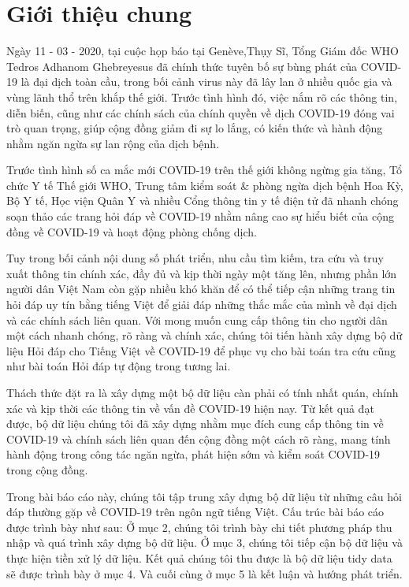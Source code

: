 \documentclass[runningheads]{llncs}
\begin{document}
\section{Giới thiệu chung}

Ngày 11 - 03 - 2020, tại cuộc họp báo tại Genève,Thụy Sĩ, Tổng Giám đốc WHO Tedros Adhanom Ghebreyesus đã chính thức tuyên bố sự bùng phát của COVID-19 là đại dịch toàn cầu, trong bối cảnh virus này đã lây lan ở nhiều quốc gia và vùng lãnh thổ trên khắp thế giới. Trước tình hình đó, việc nắm rõ các thông tin, diễn biến, cũng như các chính sách của chính quyền về dịch COVID-19 đóng vai trò quan trọng, giúp cộng đồng giảm đi sự lo lắng, có kiến thức và hành động nhằm ngăn ngừa sự lan rộng của dịch bệnh.

Trước tình hình số ca mắc mới COVID-19 trên thế giới không ngừng gia tăng, Tổ chức Y tế Thế giới WHO, Trung tâm kiểm soát \& phòng ngừa dịch bệnh Hoa Kỳ, Bộ Y tế, Học viện Quân Y và nhiều Cổng thông tin y tế điện tử đã nhanh chóng soạn thảo các trang hỏi đáp về COVID-19 nhằm nâng cao sự hiểu biết của cộng đồng về COVID-19 và hoạt động phòng chống dịch. 

Tuy trong bối cảnh nội dung số phát triển, nhu cầu tìm kiếm, tra cứu và truy xuất thông tin chính xác, đầy đủ và kịp thời ngày một tăng lên, nhưng phần lớn người dân Việt Nam còn gặp nhiều khó khăn để có thể tiếp cận những trang tin hỏi đáp uy tín bằng tiếng Việt để giải đáp những thắc mắc của mình về đại dịch và các chính sách liên quan.
Với mong muốn cung cấp thông tin cho người dân một cách nhanh chóng, rõ ràng và chính xác, chúng tôi tiến hành xây dựng bộ dữ liệu Hỏi đáp cho Tiếng Việt về COVID-19 để phục vụ cho bài toán tra cứu cũng như bài toán Hỏi đáp tự động trong tương lai.

Thách thức đặt ra là xây dựng một bộ dữ liệu càn phải có tính nhất quán, chính xác và kịp thời các thông tin về vấn đề COVID-19 hiện nay. Từ kết quả đạt được, bộ dữ liệu chúng tôi đã xây dựng nhằm mục đích cung cấp thông tin về COVID-19 và chính sách liên quan đến cộng đồng một cách rõ ràng, mang tính hành động trong công tác ngăn ngừa, phát hiện sớm và kiểm soát COVID-19 trong cộng đồng.

Trong bài báo cáo này, chúng tôi tập trung xây dựng bộ dữ liệu từ những câu hỏi đáp thường gặp về COVID-19 trên ngôn ngữ tiếng Việt. Cấu trúc bài báo cáo được trình bày như sau: Ở mục 2, chúng tôi trình bày chi tiết phương pháp thu nhập và quá trình xây dựng bộ dữ liệu. Ở mục 3, chúng tôi tiếp cận bộ dữ liệu và thực hiện tiền xử lý dữ liệu. Kết quả chúng tôi thu được là bộ dữ liệu tidy data sẽ được trình bày ở mục 4. Và cuối cùng ở mục 5 là kết luận và hướng phát triển.
\end{document}
